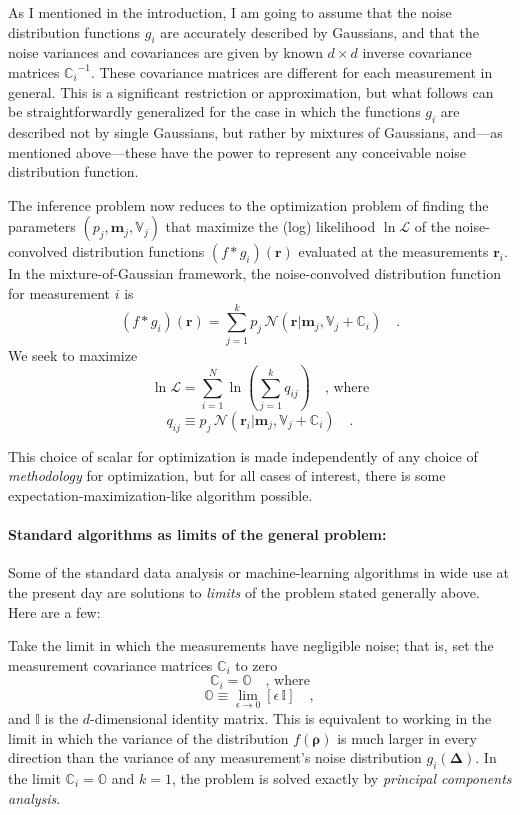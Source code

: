 \documentclass[12pt]{article}
\newcommand{\Mvector}[1]{\boldsymbol{#1}}
\newcommand{\measurement}{\Mvector{r}}
\newcommand{\truepoint}{\Mvector{\rho}}
\newcommand{\noise}{\Mvector{\Delta}}
\newcommand{\measurementi}{\measurement_i}
\newcommand{\mean}{\Mvector{m}}
\newcommand{\meanj}{\mean_j}
\newcommand{\truedist}{f}
\newcommand{\noisedisti}{g_i}
\newcommand{\gaussian}{\mathcal{N}\!}
\newcommand{\lnlike}{\ln\mathcal{L}}
\newcommand{\ampj}{p_j}
\newcommand{\ampij}{q_{ij}}
\newcommand{\Mmatrix}[1]{\mathbb{#1}}
\newcommand{\varj}{\Mmatrix{V}_j}
\newcommand{\covari}{\Mmatrix{C}_i}
\newcommand{\zero}{\Mmatrix{O}}
\newcommand{\identity}{\Mmatrix{I}}
\newcommand{\inverse}[1]{{#1}^{-1}}
\newcommand{\invcovari}{\inverse{\covari}}
\begin{document}
As I mentioned in the introduction, I am going to assume that the
noise distribution functions $\noisedisti$ are accurately described by
Gaussians, and that the noise variances and covariances are given by
known $d\times d$ inverse covariance matrices $\invcovari$.  These
covariance matrices are different for each measurement in general.
This is a significant restriction or approximation, but what follows
can be straightforwardly generalized for the case in which the
functions $\noisedisti$ are described not by single Gaussians, but
rather by mixtures of Gaussians, and---as mentioned above---these have
the power to represent any conceivable noise distribution function.

The inference problem now reduces to the optimization problem of
finding the parameters $(\ampj,\meanj,\varj)$ that maximize the (log)
likelihood $\lnlike$ of the noise-convolved distribution functions
$(\truedist * \noisedisti)(\measurement)$ evaluated at the
measurements $\measurementi$.  In the mixture-of-Gaussian framework,
the noise-convolved distribution function for measurement $i$ is
\begin{equation}
(\truedist * \noisedisti)(\measurement) =
  \sum_{j=1}^k\ampj\,\gaussian(\measurement|\meanj,\varj+\covari)
\quad .
\end{equation}
We seek to maximize
\begin{equation}
\lnlike = \sum_{i=1}^N
  \ln\left( \sum_{j=1}^k\ampij \right)
\quad \mbox{, where}
\end{equation}
\begin{equation}
\ampij\equiv \ampj\,\gaussian(\measurementi|\meanj,\varj+\covari)
\quad .
\end{equation}

This choice of scalar for optimization is made independently of any
choice of \emph{methodology} for optimization, but for all cases of
interest, there is some expectation-maximization-like algorithm
possible.

\paragraph{Standard algorithms as limits of the general problem:}
Some of the standard data analysis or machine-learning algorithms in
wide use at the present day are solutions to \emph{limits} of the
problem stated generally above.  Here are a few:

Take the limit in which the measurements have negligible noise;
that is, set the measurement covariance matrices $\covari$ to zero
\begin{equation}
\covari = \zero \quad \mbox{, where}
\end{equation}
\begin{equation}
\zero \equiv \lim_{\epsilon \rightarrow 0} [\epsilon\,\identity]
\quad ,
\end{equation}
and $\identity$ is the $d$-dimensional identity matrix.  This is
equivalent to working in the limit in which the variance of the
distribution $\truedist(\truepoint)$ is much larger in every direction
than the variance of any measurement's noise distribution
$\noisedisti(\noise)$.  In the limit $\covari=\zero$ and $k=1$, the
problem is solved exactly by \emph{principal components analysis}.
\end{document}
